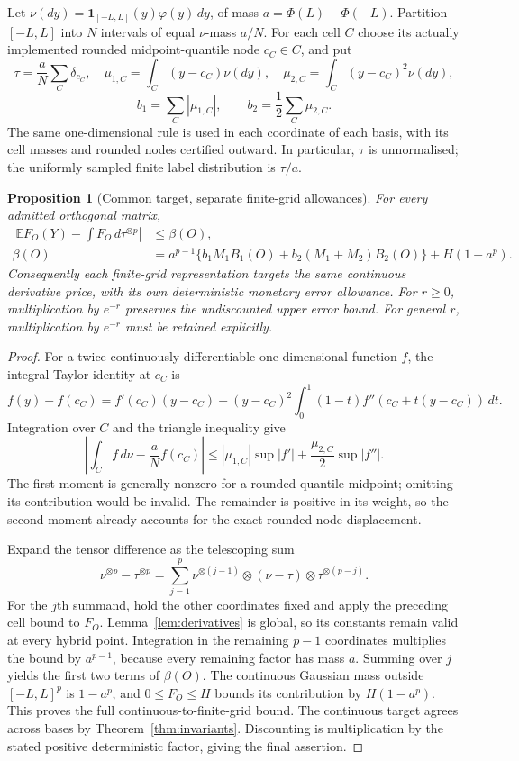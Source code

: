 \documentclass[11pt,a4paper]{article}
\newtheorem{proposition}[theorem]{Proposition}
\newcommand{\E}{\mathbb E}
\newcommand{\ind}{\mathbf 1}
\begin{document}
Let $\nu(dy)=\ind_{[-L,L]}(y)\varphi(y)\,dy$, of mass
$a=\Phi(L)-\Phi(-L)$. Partition $[-L,L]$ into $N$ intervals of equal
$\nu$-mass $a/N$. For each cell $C$ choose its actually implemented
rounded midpoint-quantile node $c_C\in C$, and put
\[
 \tau=\frac aN\sum_C\delta_{c_C},\quad
 \mu_{1,C}=\int_C(y-c_C)\nu(dy),\quad
 \mu_{2,C}=\int_C(y-c_C)^2\nu(dy),
\]
\[
 b_1=\sum_C|\mu_{1,C}|,\qquad
 b_2=\frac12\sum_C\mu_{2,C}.
\]
The same one-dimensional rule is used in each coordinate of each basis,
with its cell masses and rounded nodes certified outward. In particular,
$\tau$ is unnormalised; the uniformly sampled finite label distribution
is $\tau/a$.

\begin{proposition}[Common target, separate finite-grid allowances]
\label{prop:transfer}
For every admitted orthogonal matrix,
\begin{align*}
 \left|\E F_O(Y)-\int F_O\,d\tau^{\otimes p}\right|
 &\leq \beta(O),\\
 \beta(O)&=a^{p-1}\{b_1M_1B_1(O)
                 +b_2(M_1+M_2)B_2(O)\}+H(1-a^p).
\end{align*}
Consequently each finite-grid representation targets the same continuous
derivative price, with its own deterministic monetary error allowance.
For $r\geq0$, multiplication by $e^{-r}$ preserves the undiscounted
upper error bound. For general $r$, multiplication by $e^{-r}$ must be
retained explicitly.
\end{proposition}
\begin{proof}
For a twice continuously differentiable one-dimensional function $f$,
the integral Taylor identity at $c_C$ is
\[
 f(y)-f(c_C)=f'(c_C)(y-c_C)
 +(y-c_C)^2\int_0^1(1-t)f''(c_C+t(y-c_C))\,dt.
\]
Integration over $C$ and the triangle inequality give
\[
 \left|\int_C f\,d\nu-\frac aN f(c_C)\right|
 \leq |\mu_{1,C}|\sup|f'|+
           \frac{\mu_{2,C}}2\sup|f''|.
\]
The first moment is generally nonzero for a rounded quantile midpoint;
omitting its contribution would be invalid. The remainder is positive
in its weight, so the second moment already accounts for the exact
rounded node displacement.

Expand the tensor difference as the telescoping sum
\[
 \nu^{\otimes p}-\tau^{\otimes p}
 =\sum_{j=1}^p
 \nu^{\otimes(j-1)}\otimes(\nu-\tau)
                  \otimes\tau^{\otimes(p-j)}.
\]
For the $j$th summand, hold the other coordinates fixed and apply the
preceding cell bound to $F_O$. Lemma~\ref{lem:derivatives} is global,
so its constants remain valid at every hybrid point. Integration in
the remaining $p-1$ coordinates multiplies the bound by $a^{p-1}$,
because every remaining factor has mass $a$. Summing over $j$ yields
the first two terms of $\beta(O)$. The continuous Gaussian mass outside
$[-L,L]^p$ is $1-a^p$, and $0\leq F_O\leq H$ bounds its contribution
by $H(1-a^p)$. This proves the full continuous-to-finite-grid bound.
The continuous target agrees across bases by
Theorem~\ref{thm:invariants}. Discounting is multiplication by the stated
positive deterministic factor, giving the final assertion.
\end{proof}
\end{document}
